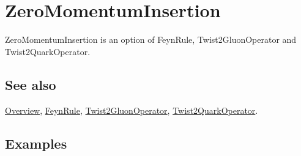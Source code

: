 \documentclass[../FeynCalcManual.tex]{subfiles}
\begin{document}
\hypertarget{zeromomentuminsertion}{
\section{ZeroMomentumInsertion}\label{zeromomentuminsertion}}

ZeroMomentumInsertion is an option of FeynRule, Twist2GluonOperator and
Twist2QuarkOperator.

\subsection{See also}

\hyperlink{toc}{Overview}, \hyperlink{feynrule}{FeynRule},
\hyperlink{twist2gluonoperator}{Twist2GluonOperator},
\hyperlink{twist2quarkoperator}{Twist2QuarkOperator}.

\subsection{Examples}
\end{document}

